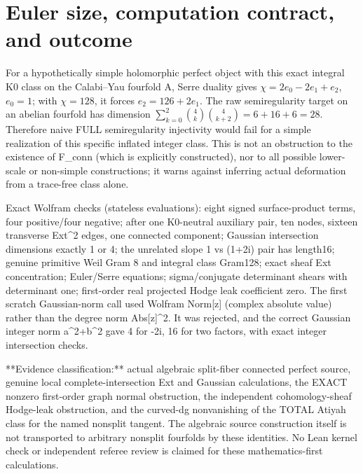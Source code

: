 \documentclass[11pt,a4paper]{article}
\begin{document}
\section{Euler size, computation contract, and outcome}
For a hypothetically simple holomorphic perfect
object with this exact integral K0 class on
the Calabi--Yau fourfold A, Serre duality gives
\(\chi=2e_0-2e_1+e_2\), \(e_0=1\);
with \(\chi=128\), it forces
\(e_2=126+2e_1\).
The raw semiregularity target on an
abelian fourfold has dimension
\(\sum_{k=0}^{2}\binom4k\binom4{k+2}
=6+16+6=28\).
Therefore naive FULL semiregularity injectivity
would fail for a simple realization of
this specific inflated integer class.
This is not an obstruction to the existence
of F_conn (which is explicitly constructed),
nor to all possible lower-scale or
non-simple constructions; it warns
against inferring actual deformation
from a trace-free class alone.

Exact Wolfram checks (stateless evaluations):
eight signed surface-product terms, four
positive/four negative; after one
K0-neutral auxiliary pair, ten nodes,
sixteen transverse Ext^2 edges,
one connected component; Gaussian
intersection dimensions exactly 1 or 4;
the unrelated slope 1 vs (1+2i) pair
has length16; genuine primitive
Weil Gram 8 and integral class Gram128;
exact sheaf Ext concentration;
Euler/Serre equations;
sigma/conjugate determinant shears with
determinant one; first-order real projected
Hodge leak coefficient zero.
The first scratch Gaussian-norm call
used Wolfram Norm[z] (complex absolute
value) rather than the degree norm
Abs[z]^2. It was rejected, and the
correct Gaussian integer norm
a^2+b^2 gave 4 for -2i,
16 for two factors, with exact
integer intersection checks.

**Evidence classification:** actual
algebraic split-fiber connected perfect
source, genuine local complete-intersection
Ext and Gaussian calculations,
the EXACT nonzero first-order graph
normal obstruction, the independent
cohomology-sheaf Hodge-leak obstruction,
and the curved-dg nonvanishing of the
TOTAL Atiyah class for the named
nonsplit tangent. The algebraic
source construction itself is
not transported to arbitrary
nonsplit fourfolds by these
identities. No Lean kernel
check or independent referee
review is claimed for these
mathematics-first calculations.
\end{document}
